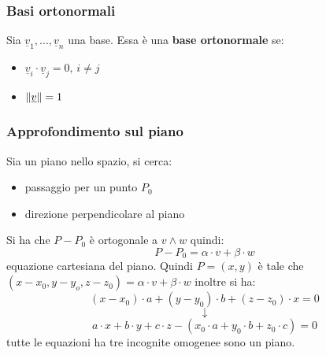 \documentclass[a4paper,12pt, oneside]{book}
\begin{document}
\subsubsection{Basi ortonormali}
\begin{definizione}
	Sia $\underline{v}_1,...,\underline{v}_n$ una base. Essa è una \textbf{base ortonormale }se:
	\begin{itemize}
		\item $\underline{v}_i\cdot \underline{v}_j=0,\, i\neq j$
		\item $\left\lVert {\underline{v}} \right\rVert=1$
	\end{itemize}
\end{definizione}
\subsubsection{Approfondimento sul piano}
Sia un piano nello spazio, si cerca:
\begin{itemize}
	\item passaggio per un punto $P_0$
	\item direzione perpendicolare al piano
\end{itemize}
Si ha che $P-P_0$ è ortogonale a $v\land w$ quindi:
$$P-P_0=\alpha	\cdot v+\beta\cdot w$$
equazione cartesiana del piano. Quindi $P=(x,y)$ è tale che $(x-x_0,y-y_o,z-z_0)=\alpha\cdot v+\beta\cdot w$
inoltre si ha:
$$(x-x_0)\cdot a+(y-y_0)\cdot b+(z-z_0)\cdot x=0$$
$$\downarrow$$
$$a\cdot x+b\cdot y+c\cdot z-(x_0\cdot a+y_0\cdot b+z_0\cdot c)=0$$
tutte le equazioni ha tre incognite omogenee sono un piano.
\end{document}
